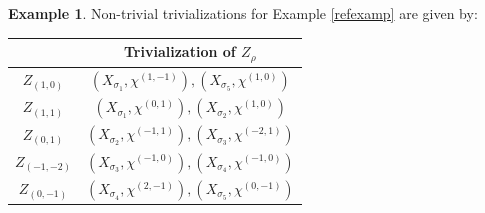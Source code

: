 \documentclass[11pt, reqno]{amsart}
\theoremstyle{plain}
\theoremstyle{definition}
\newtheorem{example}[theorem]{Example}
\theoremstyle{remark}
\begin{document}
\begin{example}
Non-trivial trivializations for Example  \ref{refexamp}
are given by:
\begin{center}
 \begin{tabular}{|c| c |} 
 \hline
  & Trivialization of $Z_{\rho}$ \\ [1ex] 
 \hline\hline
 $Z_{(1, 0)}$ & $(X_{\sigma_{1}}, \chi^{(1, -1)}), (X_{\sigma_{5}}, \chi^{(1, 0)})$ \\ [2ex] 
 \hline
 $Z_{(1,1)}$ & $(X_{\sigma_{1}}, \chi^{(0, 1)}), (X_{\sigma_{2}}, \chi^{(1, 0)})$ \\  [2ex] 
 \hline
 $Z_{(0,1)}$ & $(X_{\sigma_{2}}, \chi^{(-1, 1)}), (X_{\sigma_{3}}, \chi^{(-2, 1)})$  \\ [2ex] 
 \hline
 $Z_{(-1,-2)}$ & $(X_{\sigma_{3}}, \chi^{(-1, 0)}), (X_{\sigma_{4}}, \chi^{(-1, 0)})$ \\ [2ex] 
 \hline
 $Z_{(0,-1)}$ & $(X_{\sigma_{4}}, \chi^{(2, -1)}), (X_{\sigma_{5}}, \chi^{(0, -1)})$  \\  [2ex] 
 \hline
\end{tabular}
\end{center}
\end{example}
\end{document}
